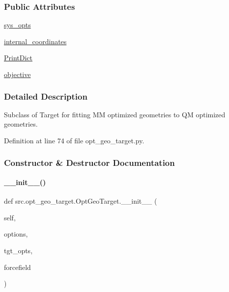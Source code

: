 \subsubsection*{Public Attributes}
\begin{DoxyCompactItemize}
\item 
\hyperlink{classsrc_1_1opt__geo__target_1_1OptGeoTarget_a301e9f7953425a4cf837077dd1cc6055}{sys\+\_\+opts}
\item 
\hyperlink{classsrc_1_1opt__geo__target_1_1OptGeoTarget_af7a4157a6ca9b60ecf801ed65754f1e6}{internal\+\_\+coordinates}
\item 
\hyperlink{classsrc_1_1opt__geo__target_1_1OptGeoTarget_aa80b789e03b7fd61cc04b79fa6be3086}{Print\+Dict}
\item 
\hyperlink{classsrc_1_1opt__geo__target_1_1OptGeoTarget_a5b86dae64ad13db75e1251856d06d301}{objective}
\end{DoxyCompactItemize}


\subsubsection{Detailed Description}
Subclass of Target for fitting MM optimized geometries to QM optimized geometries. 



Definition at line 74 of file opt\+\_\+geo\+\_\+target.\+py.



\subsubsection{Constructor \& Destructor Documentation}
\mbox{\label{classsrc_1_1opt__geo__target_1_1OptGeoTarget_a6ced711f4eee45542af1fdb9df23dee6}} 
\paragraph{\texorpdfstring{\+\_\+\+\_\+init\+\_\+\+\_\+()}{\_\_init\_\_()}}
{\footnotesize\ttfamily def src.\+opt\+\_\+geo\+\_\+target.\+Opt\+Geo\+Target.\+\_\+\+\_\+init\+\_\+\+\_\+ (\begin{DoxyParamCaption}\item[{}]{self,  }\item[{}]{options,  }\item[{}]{tgt\+\_\+opts,  }\item[{}]{forcefield }\end{DoxyParamCaption})}



